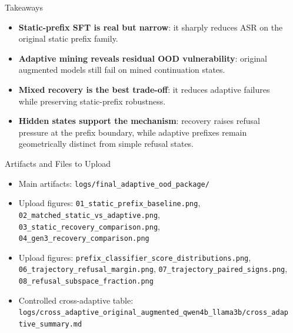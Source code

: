 \documentclass[final]{beamer}
\newlength{\sepwid}
\newlength{\onecolwid}
\begin{document}
\begin{frame}[t]
\begin{columns}[t]
\begin{column}{\onecolwid}
\begin{alertblock}{Takeaways}
\begin{itemize}
    \item \textbf{Static-prefix SFT is real but narrow}: it sharply reduces ASR on the original static prefix family.
    \item \textbf{Adaptive mining reveals residual OOD vulnerability}: original augmented models still fail on mined continuation states.
    \item \textbf{Mixed recovery is the best trade-off}: it reduces adaptive failures while preserving static-prefix robustness.
    \item \textbf{Hidden states support the mechanism}: recovery raises refusal pressure at the prefix boundary, while adaptive prefixes remain geometrically distinct from simple refusal states.
\end{itemize}
\end{alertblock}

\begin{block}{Artifacts and Files to Upload}
\footnotesize
\begin{itemize}
    \item Main artifacts: \texttt{logs/final\_adaptive\_ood\_package/}
    \item Upload figures: \texttt{01\_static\_prefix\_baseline.png}, \texttt{02\_matched\_static\_vs\_adaptive.png}, \texttt{03\_static\_recovery\_comparison.png}, \texttt{04\_gen3\_recovery\_comparison.png}
    \item Upload figures: \texttt{prefix\_classifier\_score\_distributions.png}, \texttt{06\_trajectory\_refusal\_margin.png}, \texttt{07\_trajectory\_paired\_signs.png}, \texttt{08\_refusal\_subspace\_fraction.png}
    \item Controlled cross-adaptive table: \texttt{logs/cross\_adaptive\_original\_augmented\_qwen4b\_llama3b/cross\_adaptive\_summary.md}
\end{itemize}
\end{block}

\end{column}

\begin{column}{\sepwid}\end{column}

\end{columns}
\end{frame}
\end{document}
